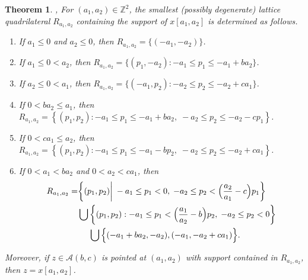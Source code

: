 \documentclass[11pt]{amsart}
\newtheorem{theorem}{Theorem}[section]
\theoremstyle{remark}
\numberwithin{equation}{section}
\newcommand{\ZZ}{\mathbb{Z}}
\newcommand{\cA}{\mathcal{A}}
\begin{document}
\begin{theorem}\label{th:Newton polygons}\cite[Proposition~4.1]{LLZ}, \cite[Corollary~3.5]{LLZ2}
  For $(a_1,a_2)\in\ZZ^2$, the smallest (possibly degenerate) lattice quadrilateral $R_{a_1,a_2}$ containing the support of $x[a_1,a_2]$ is determined as follows.
  \begin{enumerate}
    \item If $a_1 \leq 0$ and $a_2 \leq 0$, then $R_{a_1,a_2} = \{(-a_1,-a_2)\}$.
    \item If $a_1 \leq 0 < a_2$, then $R_{a_1,a_2} = \{(p_1,-a_2): -a_1\leq p_1\leq -a_1+ba_2\}$.
    \item If $a_2 \leq 0 < a_1$, then $R_{a_1,a_2} = \{(-a_1,p_2): -a_2 \leq p_2 \leq -a_2+ca_1\}$.
    \item If $0<ba_2\leq a_1$, then $R_{a_1,a_2}=\left\{(p_1,p_2): -a_1\le p_1\le -a_1+ba_2,\; -a_2\le p_2\le -a_2-cp_1\right\}$.
    \item If $0<ca_1\leq a_2$, then $R_{a_1,a_2}=\left\{(p_1,p_2): -a_1\le p_1\le -a_1-bp_2,\; -a_2\le p_2\le -a_2+ca_1\right\}$.
    \item If $0 < a_1 < ba_2$ and $0 < a_2 < ca_1$, then
    $$\aligned
    R_{a_1,a_2}=&\bigg\{(p_1,p_2)\bigg|\; -a_1\le p_1<0,\; -a_2\le p_2<\Big(\frac{a_2}{a_1}-c\Big)p_1\bigg\}\\
    &\bigcup\bigg\{(p_1,p_2): -a_1\le p_1<\Big(\frac{a_1}{a_2}-b\Big)p_2,\; -a_2\le p_2<0\bigg\}\\
    &\hspace{1.35em}\bigcup\Big\{(-a_1+ba_2,-a_2),(-a_1,-a_2+ca_1)\Big\}.
    \endaligned
    $$
  \end{enumerate}
  Moreover, if $z\in\cA(b,c)$ is pointed at $(a_1,a_2)$ with support contained in $R_{a_1,a_2}$, then $z=x[a_1,a_2]$. 
\end{theorem}
\end{document}
